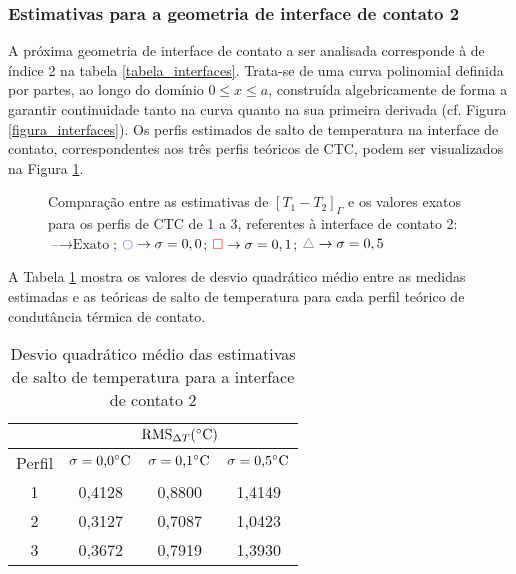 \subsubsection{Estimativas para a geometria de interface de contato 2}

A próxima geometria de interface de contato a ser analisada corresponde à de índice 2 na tabela \ref{tabela_interfaces}. Trata-se de uma curva polinomial definida por partes, ao longo do domínio $0 \le x \le a$, construída algebricamente de forma a garantir continuidade tanto na curva quanto na sua primeira derivada (cf. Figura \ref{figura_interfaces}). Os perfis estimados de salto de temperatura na interface de contato, correspondentes aos três perfis teóricos de CTC, podem ser visualizados na Figura \ref{figura_delta_temperaturas_interface_02}.
\begin{figure}[H]
	\caption{Comparação entre as estimativas de $[T_1 - T_2]_\Gamma$ e os valores exatos para os perfis de CTC de 1 a 3, referentes à interface de contato 2: $\text{--} \rightarrow \text{Exato}$; $\textcolor{blue}{\ocircle} \rightarrow \sigma = 0,0$; $\textcolor{red}{\square} \rightarrow \sigma = 0,1$; $\textcolor{gray}{\triangle} \rightarrow \sigma = 0,5$}
	\label{figura_delta_temperaturas_interface_02}
\end{figure}

A Tabela \ref{tabela_rms_delta_temperaturas_interface_2} mostra os valores de desvio quadrático médio entre as medidas estimadas e as teóricas de salto de temperatura para cada perfil teórico de condutância térmica de contato.
\begin{table}[H]
	\centering
	\caption{Desvio quadrático médio das estimativas de salto de temperatura para a interface de contato 2}
	\begin{tabular}{c|c|c|c|}
		\cline{2-4}
		& \multicolumn{3}{c|}{$\text{RMS}_{\Delta T} (\celsius)$} \\ \hline
		\multicolumn{1}{|c|}{Perfil} & $\sigma = \text{0,0}\celsius$   & $\sigma = \text{0,1}\celsius$    & $\sigma = \text{0,5}\celsius$  \\ \hline
		\multicolumn{1}{|c|}{1}      & 0,4128       & 0,8800       & 1,4149      \\ \hline
		\multicolumn{1}{|c|}{2}      & 0,3127       & 0,7087       & 1,0423      \\ \hline
		\multicolumn{1}{|c|}{3}      & 0,3672       & 0,7919       & 1,3930      \\ \hline
	\end{tabular}
	\label{tabela_rms_delta_temperaturas_interface_2}
\end{table}

